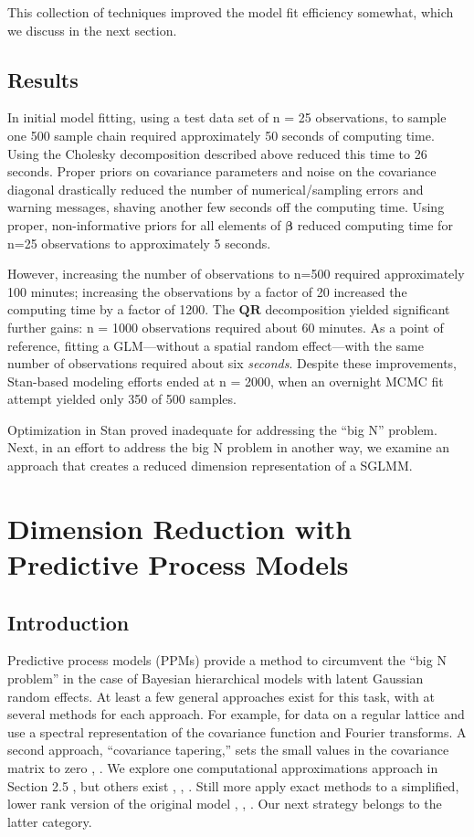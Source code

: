 This collection of techniques improved the model fit efficiency somewhat, which we discuss in the next section.

\subsection{Results}

In initial model fitting, using a test data set of n = 25 observations, to sample one 500 sample chain required approximately 50 seconds of computing time. Using the Cholesky decomposition described above reduced this time to 26 seconds. Proper priors on covariance parameters and noise on the covariance diagonal drastically reduced the number of numerical/sampling errors and warning messages, shaving another few seconds off the computing time. Using proper, non-informative priors for all elements of $\pmb{\beta}$ reduced computing time for n=25 observations to approximately 5 seconds. 

However, increasing the number of observations to n=500 required approximately 100 minutes; increasing the observations by a factor of 20 increased the computing time by a factor of 1200. The $\pmb{QR}$ decomposition yielded significant further gains: n = 1000 observations required about 60 minutes. As a point of reference, fitting a GLM---without a spatial random effect---with the same number of observations required about six {\it seconds}. Despite these improvements, Stan-based modeling efforts ended at n = 2000, when an overnight MCMC fit attempt yielded only 350 of 500 samples.

Optimization in Stan proved inadequate for addressing the ``big N'' problem. Next, in an effort to address the big N problem in another way, we examine an approach that creates a reduced dimension representation of a SGLMM. 

\section{Dimension Reduction with Predictive Process Models} \label{ppm} %

\subsection{Introduction}

Predictive process models (PPMs) provide a method to circumvent the ``big N problem'' in the case of Bayesian hierarchical models with latent Gaussian random effects. At least a few general approaches exist for this task, with at several methods for each approach. For example, for data on a regular lattice \cite{Fuentes2007} and \citep{Paciorek2007} use a spectral representation of the covariance function and Fourier transforms. A second approach, ``covariance tapering,'' sets the small values in the covariance matrix to zero \citep{Furrer2006}, \citep{Kaufman2008}. We explore one computational approximations approach in Section 2.5 \citep{Rue2009}, but others exist \citep{Stein2004}, \citep{Eidsvik2014}, \citep{Aune2014}. Still more apply exact methods to a simplified, lower rank version of the original model \citep{Cressie2008}, \citep{Higdon2002}, \citep{Eidsvik2012}. Our next strategy belongs to the latter category. 

